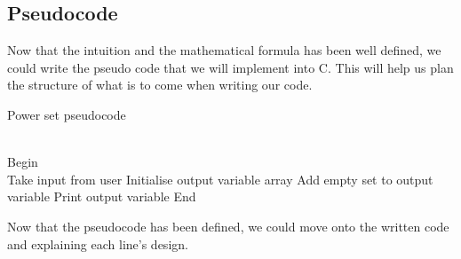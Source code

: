 \documentclass[a4paper]{article}
\theoremstyle{plain}
\theoremstyle{definition}
\theoremstyle{remark}
\begin{document}
\subsection{Pseudocode}
Now that the intuition and the mathematical formula has been well defined, we could write the pseudo code that we will implement into C. This will help us plan the structure of what is to come when writing our code.\\

\begin{algorithm}[H]
	\caption{Power set pseudocode}
	\\

	Begin \\
	Take input from user\;
	Initialise output variable array\;
	Add empty set to output variable\;
	Print output variable\;
	End
\end{algorithm}

\begin{flushleft}
Now that the pseudocode has been defined, we could move onto the written code and explaining each line's design.
\end{flushleft}
\end{document}
